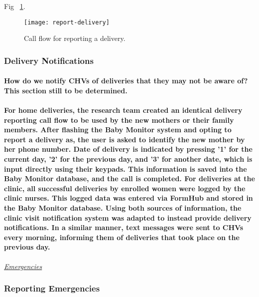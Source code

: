 Fig ~\ref{fig:delivery}.
\begin{figure}[]
	\begin{center}
	\texttt{[image: report-delivery]}
	\end{center}
	\caption{Call flow for reporting a delivery.}
	\label{fig:delivery}
\end{figure}

\subsubsection{Delivery Notifications}
\paragraph{How do we notify CHVs of deliveries that they may not be aware of? This section still to be determined.}%

\paragraph{For home deliveries, the research team created an identical delivery reporting call flow to be used by the new mothers or their family members. After flashing the Baby Monitor system and opting to report a delivery as, the user is asked to identify the new mother by her phone number. Date of delivery is indicated by pressing '1' for the current day, '2' for the previous day, and '3' for another date, which is input directly using their keypads. This  information is saved into the Baby Monitor database, and the call is completed. For deliveries at the clinic, all successful deliveries by enrolled women were logged by the clinic nurses. This logged data was entered via FormHub and stored in the Baby Monitor database. Using both sources of information, the clinic visit notification system was adapted to instead provide delivery notifications. In a similar manner, text messages were sent to CHVs every morning, informing them of deliveries that took place on the previous day.} 

\underline{\textit{Emergencies}}

\subsubsection{Reporting Emergencies}
